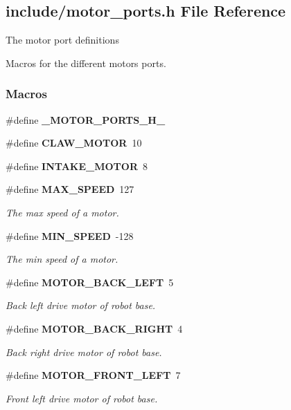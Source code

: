 \subsection{include/motor\+\_\+ports.h File Reference}
\label{a00050}


The motor port definitions

Macros for the different motors ports.  


\subsubsection*{Macros}
\begin{DoxyCompactItemize}
\item 
\#define \textbf{ \+\_\+\+M\+O\+T\+O\+R\+\_\+\+P\+O\+R\+T\+S\+\_\+\+H\+\_\+}
\item 
\#define \textbf{ C\+L\+A\+W\+\_\+\+M\+O\+T\+OR}~10
\item 
\#define \textbf{ I\+N\+T\+A\+K\+E\+\_\+\+M\+O\+T\+OR}~8
\item 
\#define \textbf{ M\+A\+X\+\_\+\+S\+P\+E\+ED}~127
\begin{DoxyCompactList}\small\item\em The max speed of a motor. \end{DoxyCompactList}\item 
\#define \textbf{ M\+I\+N\+\_\+\+S\+P\+E\+ED}~-\/128
\begin{DoxyCompactList}\small\item\em The min speed of a motor. \end{DoxyCompactList}\item 
\#define \textbf{ M\+O\+T\+O\+R\+\_\+\+B\+A\+C\+K\+\_\+\+L\+E\+FT}~5
\begin{DoxyCompactList}\small\item\em Back left drive motor of robot base. \end{DoxyCompactList}\item 
\#define \textbf{ M\+O\+T\+O\+R\+\_\+\+B\+A\+C\+K\+\_\+\+R\+I\+G\+HT}~4
\begin{DoxyCompactList}\small\item\em Back right drive motor of robot base. \end{DoxyCompactList}\item 
\#define \textbf{ M\+O\+T\+O\+R\+\_\+\+F\+R\+O\+N\+T\+\_\+\+L\+E\+FT}~7
\begin{DoxyCompactList}\small\item\em Front left drive motor of robot base. \end{DoxyCompactList}\item 

\end{DoxyCompactItemize}
